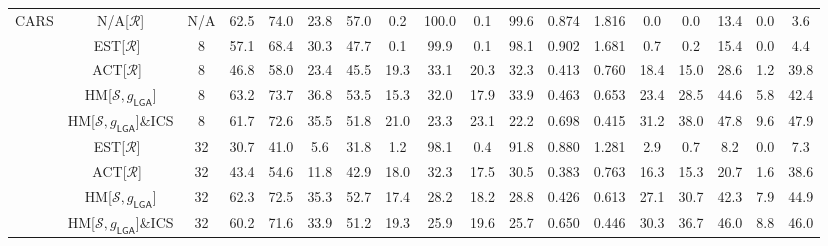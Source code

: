 \begin{table*}
{\begin{tabular}{c|cc|cccc|ccccc|ccccc|c}
	\midrule 

\multirow{9}{*}{CARS} & N/A{[}$\mathcal{R}${]} & N/A & 62.5 & 74.0 & 23.8 & 57.0 & 0.2 & 100.0 & 0.1 & 99.6 & 0.874 & 1.816 & 0.0 & 0.0 & 13.4 & 0.0 & 3.6\tabularnewline
\cline{2-18} \cline{3-18} \cline{4-18} \cline{5-18} \cline{6-18} \cline{7-18} \cline{8-18} \cline{9-18} \cline{10-18} \cline{11-18} \cline{12-18} \cline{13-18} \cline{14-18} \cline{15-18} \cline{16-18} \cline{17-18} \cline{18-18} 
 & EST{[}$\mathcal{R}${]}~\cite{advrank} & 8 & 57.1 & 68.4 & 30.3 & 47.7 & 0.1 & 99.9 & 0.1 & 98.1 & 0.902 & 1.681 & 0.7 & 0.2 & 15.4 & 0.0 & 4.4\tabularnewline
 & ACT{[}$\mathcal{R}${]}~\cite{robrank} & 8 & 46.8 & 58.0 & 23.4 & 45.5 & 19.3 & 33.1 & 20.3 & 32.3 & 0.413 & 0.760 & 18.4 & 15.0 & 28.6 & 1.2 & 39.8\tabularnewline
 & HM{[}$\mathcal{S},g_{\mathsf{LGA}}${]} & 8 & 63.2 & 73.7 & 36.8 & 53.5 & 15.3 & 32.0 & 17.9 & 33.9 & 0.463 & 0.653 & 23.4 & 28.5 & 44.6 & 5.8 & 42.4\tabularnewline
 & HM{[}$\mathcal{S},g_{\mathsf{LGA}}${]}\&ICS & 8 & 61.7 & 72.6 & 35.5 & 51.8 & 21.0 & 23.3 & 23.1 & 22.2 & 0.698 & 0.415 & 31.2 & 38.0 & 47.8 & 9.6 & 47.9\tabularnewline
\cline{2-18} \cline{3-18} \cline{4-18} \cline{5-18} \cline{6-18} \cline{7-18} \cline{8-18} \cline{9-18} \cline{10-18} \cline{11-18} \cline{12-18} \cline{13-18} \cline{14-18} \cline{15-18} \cline{16-18} \cline{17-18} \cline{18-18} 
 & EST{[}$\mathcal{R}${]}~\cite{advrank} & 32 & 30.7 & 41.0 & 5.6 & 31.8 & 1.2 & 98.1 & 0.4 & 91.8 & 0.880 & 1.281 & 2.9 & 0.7 & 8.2 & 0.0 & 7.3\tabularnewline
 & ACT{[}$\mathcal{R}${]}~\cite{robrank} & 32 & 43.4 & 54.6 & 11.8 & 42.9 & 18.0 & 32.3 & 17.5 & 30.5 & 0.383 & 0.763 & 16.3 & 15.3 & 20.7 & 1.6 & 38.6\tabularnewline
 & HM{[}$\mathcal{S},g_{\mathsf{LGA}}${]} & 32 & 62.3 & 72.5 & 35.3 & 52.7 & 17.4 & 28.2 & 18.2 & 28.8 & 0.426 & 0.613 & 27.1 & 30.7 & 42.3 & 7.9 & 44.9\tabularnewline
 & HM{[}$\mathcal{S},g_{\mathsf{LGA}}${]}\&ICS & 32 & 60.2 & 71.6 & 33.9 & 51.2 & 19.3 & 25.9 & 19.6 & 25.7 & 0.650 & 0.446 & 30.3 & 36.7 & 46.0 & 8.8 & 46.0\tabularnewline

	\midrule


\end{tabular}}
\end{table*}
